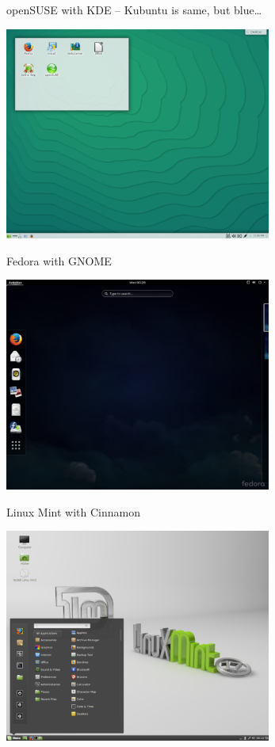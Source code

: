 \documentclass[compress, ucs, xelatex, 11pt, xcolor=svgnames,
  hyperref={
    bookmarks=true,
    unicode=true,
    colorlinks=true,
    pdftitle={Linux, command line and MetaCentrum},
    plainpages=false,
    pdfauthor={Vojtech Zeisek},
    pdfsubject={Course about use of Linux command line, writing shell scripts and using MetaCentrum of CESNET},
    pdfcreator={XeLaTeX},
    pdfkeywords={Linux, GNU, BASH, shell, command line, MetaCentrum},
    linkcolor=Red,
    anchorcolor=Blue,
    citecolor=Purple,
    filecolor=DodgerBlue,
    menucolor=DarkOrchid,
    urlcolor=DeepSkyBlue,
    pdftex},
  url={hyphens, lowtilde} %
  ]{beamer}
\begin{document}
\begin{frame}{openSUSE with KDE -- Kubuntu is same, but blue\ldots}
\begin{center}
  \includegraphics[height=7cm]{opensuse.png}
\end{center}
\end{frame}

\begin{frame}{Fedora with GNOME}
\begin{center}
  \includegraphics[height=7cm]{fedora.png}
\end{center}
\end{frame}

\begin{frame}{Linux Mint with Cinnamon}
\begin{center}
  \includegraphics[height=7cm]{mint.png}
\end{center}
\end{frame}
\end{document}
